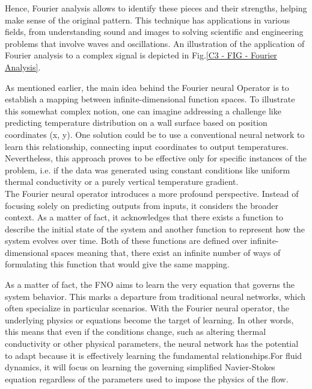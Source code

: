 Hence, Fourier analysis allows to identify these pieces and their strengths, helping make sense of the original pattern. This technique has applications in various fields, from understanding sound and images to solving scientific and engineering problems that involve waves and oscillations. An illustration of the application of Fourier analysis to a complex signal is depicted in Fig.\ref{C3 - FIG - Fourier Analysis}.\\

\vspace{-0.6em}

As mentioned earlier, the main idea behind the Fourier neural Operator is to establish a mapping between infinite-dimensional function spaces. To illustrate this somewhat complex notion, one can imagine addressing a challenge like predicting temperature distribution on a wall surface based on position coordinates (x, y). One solution could be to use a conventional neural network to learn this relationship, connecting input coordinates to output temperatures. Nevertheless, this approach proves to be effective only for specific instances of the problem, i.e. if the data was generated using constant conditions like uniform thermal conductivity or a purely vertical temperature gradient.\\

The Fourier neural operator introduces a more profound perspective. Instead of focusing solely on predicting outputs from inputs, it considers the broader context. As a matter of fact, it acknowledges that there exists a function to describe the initial state of the system and another function to represent how the system evolves over time. Both of these functions are defined over infinite-dimensional spaces meaning that, there exist an infinite number of ways of formulating this function that would give the same mapping.

\newpage

As a matter of fact, the FNO aims to learn the very equation that governs the system behavior. This marks a departure from traditional neural networks, which often specialize in particular scenarios. With the Fourier neural operator, the underlying physics or equations become the target of learning. In other words, this means that even if the conditions change, such as altering thermal conductivity or other physical parameters, the neural network has the potential to adapt because it is effectively learning the fundamental relationships.For fluid dynamics, it will focus on learning the governing simplified Navier-Stokes equation regardless of the parameters used to impose the physics of the flow.\\

